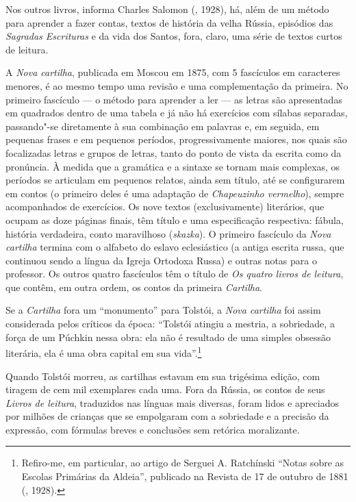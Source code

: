 Nos outros livros, informa Charles Salomon (,
1928), há, além de um método para aprender a fazer contas, textos
de história da velha Rússia, episódios das \emph{Sagradas
Escrituras} e da vida dos Santos, fora, claro, uma série de
textos curtos de leitura.

A \emph{Nova cartilha}, publicada em Moscou em 1875, com 5
fascículos em caracteres menores, é ao mesmo tempo uma revisão
e uma complementação da primeira. No primeiro fascículo --- o
método para aprender a ler --- as letras são apresentadas em
quadrados dentro de uma tabela e já não há exercícios com
sílabas separadas, passando"-se diretamente à sua combinação
em palavras e, em seguida, em pequenas frases e em pequenos
períodos, progressivamente maiores, nos quais são focalizadas
letras e grupos de letras, tanto do ponto de vista da escrita
como da pronúncia. À medida que a gramática e a sintaxe se
tornam mais complexas, os períodos se articulam em pequenos
relatos, ainda sem título, até se configurarem em contos (o
primeiro deles é uma adaptação de \emph{Chapeuzinho vermelho}),
sempre acompanhados de exercícios. Os nove textos (exclusivamente)
literários, que ocupam as doze páginas finais, têm título e uma
especificação respectiva: fábula, história verdadeira, conto
maravilhoso (\emph{skazka}). O primeiro fascículo da \emph{Nova
cartilha} termina com o alfabeto do eslavo eclesiástico (a antiga
escrita russa, que continuou sendo a língua da Igreja Ortodoxa
Russa) e outras notas para o professor. Os outros quatro
fascículos têm o título de \emph{Os quatro livros de leitura},
que contêm, em outra ordem, os contos da primeira \emph{Cartilha}.

Se a \emph{Cartilha} fora um ``monumento'' para Tolstói, a \emph{Nova
cartilha} foi assim considerada pelos críticos da época: ``Tolstói
atingiu a mestria, a sobriedade, a força de um Púchkin nessa obra:
ela não é resultado de uma simples obsessão literária, ela é uma
obra capital em sua vida''.\footnote{Refiro-me, em particular,
ao artigo de Serguei A. Ratchínski ``Notas sobre as Escolas
Primárias da Aldeia'', publicado na Revista  de 17
de outubro de 1881 (, 1928).}

Quando Tolstói morreu, as cartilhas estavam em sua trigésima
edição, com tiragem de cem mil exemplares cada uma. Fora da
Rússia, os contos de seus \emph{Livros de leitura}, traduzidos
nas línguas mais diversas, foram lidos e apreciados por milhões
de crianças que se empolgaram com a sobriedade e a precisão da
expressão, com fórmulas breves e conclusões sem retórica
moralizante.

